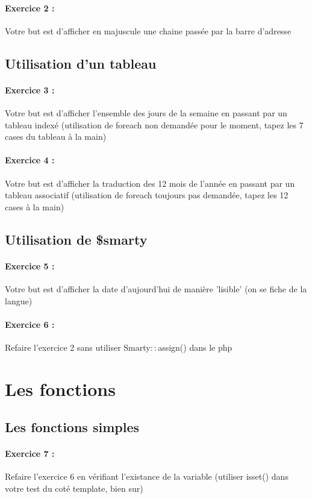 \documentclass[10pt,a4paper]{article}
\begin{document}
			\paragraph{Exercice 2 :} Votre but est d'afficher en majuscule une chaine passée par la barre d'adresse
		\subsection{Utilisation d'un tableau}
			\paragraph{Exercice 3 :} Votre but est d'afficher l'ensemble des jours de la semaine en passant par un tableau indexé (utilisation de foreach non demandée pour le moment, tapez les 7 cases du tableau à la main)
			\paragraph{Exercice 4 :} Votre but est d'afficher la traduction des 12 mois de l'année en passant par un tableau associatif (utilisation de foreach toujours pas demandée, tapez les 12 cases à la main)
		\subsection{Utilisation de \$smarty}
			\paragraph{Exercice 5 :} Votre but est d'afficher la date d'aujourd'hui de manière 'lisible' (on se fiche de la langue)
			\paragraph{Exercice 6 :} Refaire l'exercice 2 sans utiliser Smarty$::$assign() dans le php
	\section{Les fonctions}
		\subsection{Les fonctions simples}
			\paragraph{Exercice 7 :} Refaire l'exercice 6 en vérifiant l'existance de la variable (utiliser isset() dans votre test du coté template, bien sur)
\end{document}
